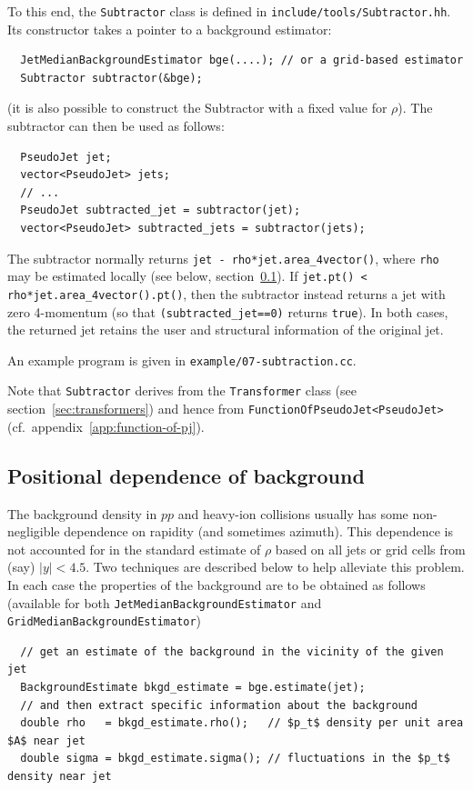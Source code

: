 \documentclass[12pt,a4]{article}
\newcommand{\ttt}[1]{{\small\texttt{#1}}}
\begin{document}
To this end, the \ttt{Subtractor} class is defined in
\ttt{include/tools/Subtractor.hh}. Its constructor takes a pointer to
a background estimator:
\begin{lstlisting}
  JetMedianBackgroundEstimator bge(....); // or a grid-based estimator
  Subtractor subtractor(&bge);
\end{lstlisting}
(it is also possible to construct the Subtractor with a fixed value
for $\rho$).
%
The subtractor can then be used as follows:
\begin{lstlisting}
  PseudoJet jet;
  vector<PseudoJet> jets;
  // ...
  PseudoJet subtracted_jet = subtractor(jet);
  vector<PseudoJet> subtracted_jets = subtractor(jets);
\end{lstlisting}
The subtractor normally returns \ttt{jet - rho*jet.area\_4vector()},
where \ttt{rho} may be estimated locally (see below,
section~\ref{sec:BGE-positional}).
%
If \ttt{jet.pt() < rho*jet.area\_4vector().pt()}, then
the subtractor instead returns a jet with zero 4-momentum (so that
\ttt{(subtracted\_jet==0)} returns \ttt{true}).
%
In both cases, the returned jet retains the user and structural
information of the original jet.

An example program is given in \ttt{example/07-subtraction.cc}.

Note that \ttt{Subtractor} derives from the \ttt{Transformer} class (see
section~\ref{sec:transformers}) and hence from 
\ttt{FunctionOfPseudoJet<PseudoJet>} (cf.\
appendix~\ref{app:function-of-pj}).



\subsection{Positional dependence of background}
\label{sec:BGE-positional}

The background density in $pp$ and heavy-ion collisions usually has
some non-negligible dependence on rapidity (and sometimes azimuth).
%
This dependence is not accounted for in the standard estimate of
$\rho$ based on all jets or grid cells from (say) $|y|<4.5$.
%
Two techniques are described below to help alleviate this problem.
%
In each case the properties of the background are to be obtained as
follows (available for both \ttt{JetMedianBackgroundEstimator} and
\ttt{GridMedianBackgroundEstimator})
\begin{lstlisting}
  // get an estimate of the background in the vicinity of the given jet
  BackgroundEstimate bkgd_estimate = bge.estimate(jet);
  // and then extract specific information about the background
  double rho   = bkgd_estimate.rho();   // $p_t$ density per unit area $A$ near jet
  double sigma = bkgd_estimate.sigma(); // fluctuations in the $p_t$ density near jet
\end{lstlisting}
\end{document}
